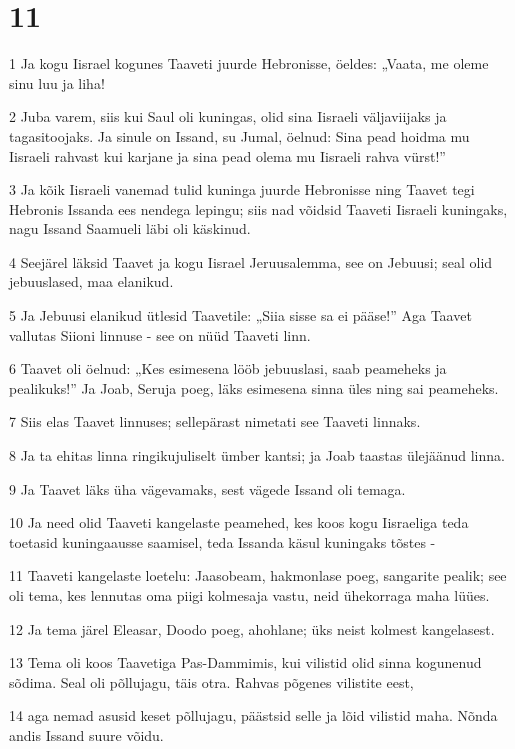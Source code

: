 \chapter{11}

\par 1 Ja kogu Iisrael kogunes Taaveti juurde Hebronisse, öeldes: „Vaata, me oleme sinu luu ja liha!
\par 2 Juba varem, siis kui Saul oli kuningas, olid sina Iisraeli väljaviijaks ja tagasitoojaks. Ja sinule on Issand, su Jumal, öelnud: Sina pead hoidma mu Iisraeli rahvast kui karjane ja sina pead olema mu Iisraeli rahva vürst!”
\par 3 Ja kõik Iisraeli vanemad tulid kuninga juurde Hebronisse ning Taavet tegi Hebronis Issanda ees nendega lepingu; siis nad võidsid Taaveti Iisraeli kuningaks, nagu Issand Saamueli läbi oli käskinud.
\par 4 Seejärel läksid Taavet ja kogu Iisrael Jeruusalemma, see on Jebuusi; seal olid jebuuslased, maa elanikud.
\par 5 Ja Jebuusi elanikud ütlesid Taavetile: „Siia sisse sa ei pääse!” Aga Taavet vallutas Siioni linnuse - see on nüüd Taaveti linn.
\par 6 Taavet oli öelnud: „Kes esimesena lööb jebuuslasi, saab peameheks ja pealikuks!” Ja Joab, Seruja poeg, läks esimesena sinna üles ning sai peameheks.
\par 7 Siis elas Taavet linnuses; sellepärast nimetati see Taaveti linnaks.
\par 8 Ja ta ehitas linna ringikujuliselt ümber kantsi; ja Joab taastas ülejäänud linna.
\par 9 Ja Taavet läks üha vägevamaks, sest vägede Issand oli temaga.
\par 10 Ja need olid Taaveti kangelaste peamehed, kes koos kogu Iisraeliga teda toetasid kuningaausse saamisel, teda Issanda käsul kuningaks tõstes -
\par 11 Taaveti kangelaste loetelu: Jaasobeam, hakmonlase poeg, sangarite pealik; see oli tema, kes lennutas oma piigi kolmesaja vastu, neid ühekorraga maha lüües.
\par 12 Ja tema järel Eleasar, Doodo poeg, ahohlane; üks neist kolmest kangelasest.
\par 13 Tema oli koos Taavetiga Pas-Dammimis, kui vilistid olid sinna kogunenud sõdima. Seal oli põllujagu, täis otra. Rahvas põgenes vilistite eest,
\par 14 aga nemad asusid keset põllujagu, päästsid selle ja lõid vilistid maha. Nõnda andis Issand suure võidu.
